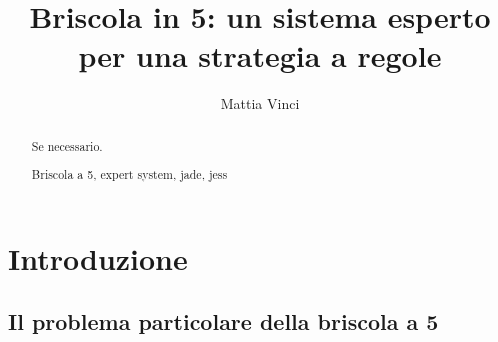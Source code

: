 \documentclass[runningheads,a4paper]{llncs}
\newcommand{\keywords}[1]{\par\addvspace\baselineskip
\noindent\keywordname\enspace\ignorespaces#1}
\begin{document}
\mainmatter


\title{Briscola in 5: un sistema esperto per una strategia a regole}
\author{Mattia Vinci}


\maketitle

\begin{abstract}

Se necessario.

\keywords{Briscola a 5, expert system, jade, jess}
\end{abstract}

\tableofcontents
\newpage



\section{Introduzione}
\subsection{Il problema particolare della briscola a 5}
\end{document}
